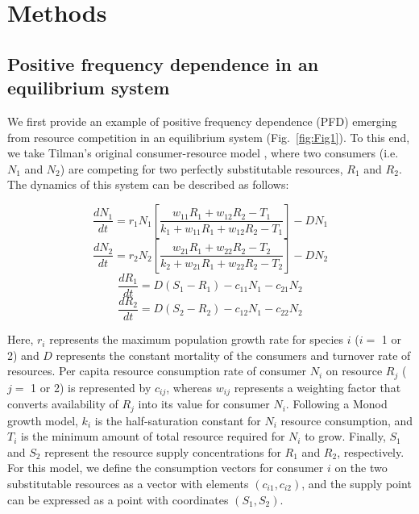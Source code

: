 \section{Methods}
\subsection{Positive frequency dependence in an equilibrium system}
We first provide an example of positive frequency dependence (PFD) emerging from resource competition in an equilibrium system (Fig.~\ref{fig:Fig1}). To this end, we take Tilman's original consumer-resource model \citep[p.~270]{tilman1982}, where two consumers (i.e. $N_{1}$ and $N_{2}$) are competing for two perfectly substitutable resources, $R_{1}$ and $R_{2}$. The dynamics of this system can be described as follows:

\begin{equation}
\frac{{d{N_1}}}{{dt}} = {r_1}{N_1}\left[ {\frac{{{w_{11}}{R_1} + {w_{12}}{R_2} - {T_1}}}{{{k_1} + {w_{11}}{R_1} + {w_{12}}{R_2} - {T_1}}}} \right] - D{N_1} \tag{3.7}\label{eq:3.7}
\end{equation}
\begin{equation}
\frac{{d{N_2}}}{{dt}} = {r_2}{N_2}\left[ {\frac{{{w_{21}}{R_1} + {w_{22}}{R_2} - {T_2}}}{{{k_2} + {w_{21}}{R_1} + {w_{22}}{R_2} - {T_2}}}} \right] - D{N_2} \tag{3.8}\label{eq:3.8}
\end{equation}
\begin{equation}
\frac{{d{R_1}}}{{dt}} = D\left( {{S_1} - {R_1}} \right) - {c_{11}}{N_1} - {c_{21}}{N_2} \tag{3.9}\label{eq:3.9}
\end{equation}
\begin{equation}
\frac{{d{R_2}}}{{dt}} = D\left( {{S_2} - {R_2}} \right) - {c_{12}}{N_1} - {c_{22}}{N_2} \tag{3.10}\label{eq:3.10}
\end{equation}

Here, $r_{i}$ represents the maximum population growth rate for species $i$ ($i = $ 1 or 2) and $D$ represents the constant mortality of the consumers and turnover rate of resources. Per capita resource consumption rate of consumer $N_{i}$ on resource $R_{j}$ ($j = $ 1 or 2) is represented by $c_{ij}$, whereas $w_{ij}$ represents a weighting factor that converts availability of $R_{j}$ into its value for consumer $N_{i}$. Following a Monod growth model, $k_{i}$ is the half-saturation constant for $N_{i}$ resource consumption, and $T_{i}$ is the minimum amount of total resource required for $N_{i}$ to grow. Finally, $S_{1}$ and $S_{2}$ represent the resource supply concentrations for $R_{1}$ and $R_{2}$, respectively. For this model, we define the consumption vectors for consumer $i$ on the two substitutable resources as a vector with elements $\left( c_{i1}, c_{i2} \right)$, and the supply point can be expressed as a point with coordinates $\left( S_{1}, S_{2} \right)$. 
\par


